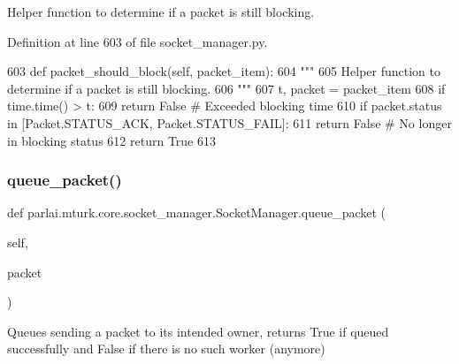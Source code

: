 \begin{DoxyVerb}Helper function to determine if a packet is still blocking.
\end{DoxyVerb}
 

Definition at line 603 of file socket\+\_\+manager.\+py.


\begin{DoxyCode}
603     \textcolor{keyword}{def }packet\_should\_block(self, packet\_item):
604         \textcolor{stringliteral}{"""}
605 \textcolor{stringliteral}{        Helper function to determine if a packet is still blocking.}
606 \textcolor{stringliteral}{        """}
607         t, packet = packet\_item
608         \textcolor{keywordflow}{if} time.time() > t:
609             \textcolor{keywordflow}{return} \textcolor{keyword}{False}  \textcolor{comment}{# Exceeded blocking time}
610         \textcolor{keywordflow}{if} packet.status \textcolor{keywordflow}{in} [Packet.STATUS\_ACK, Packet.STATUS\_FAIL]:
611             \textcolor{keywordflow}{return} \textcolor{keyword}{False}  \textcolor{comment}{# No longer in blocking status}
612         \textcolor{keywordflow}{return} \textcolor{keyword}{True}
613 
\end{DoxyCode}
\mbox{\label{classparlai_1_1mturk_1_1core_1_1socket__manager_1_1SocketManager_a91c7216d011823f1c6c4963d863638c8}} 
\subsubsection{\texorpdfstring{queue\+\_\+packet()}{queue\_packet()}}
{\footnotesize\ttfamily def parlai.\+mturk.\+core.\+socket\+\_\+manager.\+Socket\+Manager.\+queue\+\_\+packet (\begin{DoxyParamCaption}\item[{}]{self,  }\item[{}]{packet }\end{DoxyParamCaption})}

\begin{DoxyVerb}Queues sending a packet to its intended owner, returns True if queued
successfully and False if there is no such worker (anymore)
\end{DoxyVerb}
 

